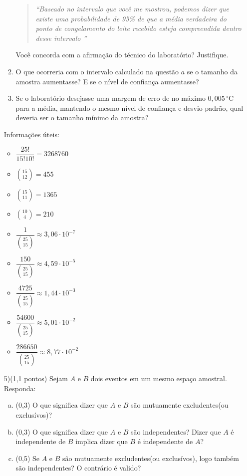 \documentclass[12pt]{article}
\begin{document}
\begin{enumerate}[a)]
\begin{enumerate}
    \begin{quote}
\textit{“Baseado no intervalo que você me mostrou, podemos dizer que existe uma probabilidade de 95\% de que a média verdadeira do ponto de congelamento do leite recebido esteja compreendida dentro desse intervalo ”}
\end{quote}

    Você concorda com a afirmação do técnico do laboratório? Justifique. 

    \item O que ocorreria com o intervalo calculado na questão $a$ se o tamanho da amostra aumentasse? E se o nível de confiança aumentasse?
    

    \item Se o laboratório desejasse uma margem de erro de no máximo \( 0{,}005\,^\circ\mathrm{C} \) para a média, mantendo o mesmo nível de confiança e desvio padrão, qual deveria ser o tamanho mínimo da amostra?
\end{enumerate}

\vspace{5px}

Informações úteis: 
\begin{itemize}
    \item $\dfrac{25!}{15!10!} = 3268760$
    \item $\binom{15}{12} = 455$
    \item $\binom{15}{11} = 1365$
    \item  $\binom{10}{4} = 210$
    \item $\dfrac{1}{\binom{25}{15}} \approx 3,06 \cdot 10^{-7}$
    \item $\dfrac{150}{\binom{25}{15}} \approx 4,59 \cdot 10^{-5}$
    \item $\dfrac{4725}{\binom{25}{15}} \approx 1,44 \cdot 10^{-3}$
    \item $\dfrac{54600}{\binom{25}{15}} \approx 5,01 \cdot 10^{-2}$
    \item $\dfrac{286650}{\binom{25}{15}} \approx 8,77 \cdot 10^{-2}$
\end{itemize}

5)(1,1 pontos) Sejam $A$ e $B$ dois eventos em um mesmo espaço amostral. Responda:

\begin{enumerate}[a)]
    \item (0,3) O que significa dizer que $A$ e $B$ são mutuamente excludentes(ou exclusívos)?
    \item (0,3) O que significa dizer que $A$ e $B$ são independentes? Dizer que $A$ é independente de $B$ implica dizer que $B$ é independente de $A$?
    \item (0,5) Se $A$ e $B$ são mutuamente excludentes(ou exclusívos), logo também são independentes? O contrário é valido?
\end{enumerate}


\end{enumerate}
\end{document}
